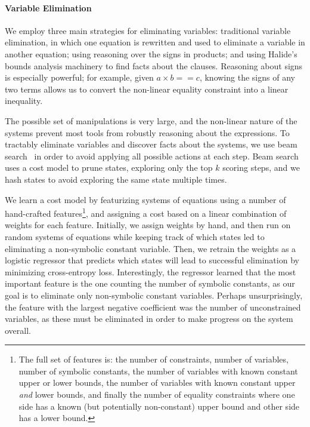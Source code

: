 \documentclass[sigplan,10pt,review,anonymous]{acmart}\settopmatter{printfolios=true,printccs=false,printacmref=false}
\begin{document}
\paragraph{Variable Elimination} We employ three main strategies for eliminating
variables: traditional variable elimination, in which one equation is rewritten and
used to eliminate a variable in another equation; using reasoning over the signs in products;
and using Halide's bounds analysis machinery to find facts about the clauses.  Reasoning about signs
is especially powerful; for example, given $a \times b == c$, knowing the signs of any
two terms allows us to convert the non-linear equality constraint into a linear inequality.

The possible
set of manipulations is very large, and the non-linear nature of the systems prevent most
tools from robustly reasoning about the expressions.  To tractably eliminate variables and discover
facts about the systems, we use beam search~\cite{beamsearch} in order to avoid applying
all possible actions at each step.  Beam search uses a cost model to prune states, exploring
only the top $k$ scoring steps, and we hash states to avoid exploring the same state multiple
times.

We learn a cost model by featurizing systems of equations using a number of hand-crafted
features\footnote{The full set of features is: the number of constraints, number of variables,
  number of symbolic constants, the number of variables with known constant upper or lower bounds,
  the number of variables with known constant upper \textit{and} lower bounds, and finally the number of
  equality constraints where one side has a known (but potentially non-constant) upper bound and other side has a lower bound.},
and assigning a cost based on a linear combination of weights for each feature.  Initially,
we assign weights by hand, and then run on random systems of equations while keeping track
of which states led to eliminating a non-symbolic constant variable.  Then, we retrain the weights
as a logistic regressor that predicts which states will lead to successful elimination
by minimizing cross-entropy loss.  Interestingly, the regressor learned that the most
important feature is the one counting the number of symbolic constants, as our goal
is to eliminate only non-symbolic constant variables.  Perhaps unsurprisingly, the feature
with the largest negative coefficient was the number of unconstrained variables, as
these must be eliminated in order to make progress on the system overall.
\end{document}
